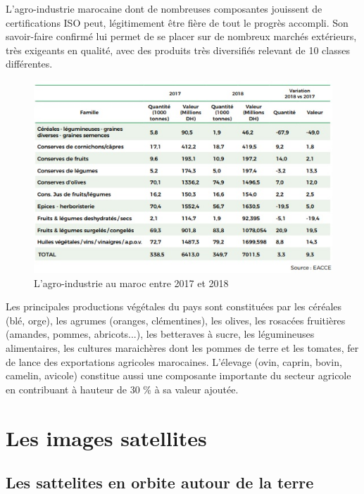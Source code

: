 \documentclass[12pt, openany]{report}
\begin{document}
L’agro-industrie marocaine dont de nombreuses composantes jouissent de certifications ISO peut, légitimement être fière de tout le progrès accompli. Son savoir-faire confirmé lui permet de se placer sur de nombreux marchés extérieurs, très exigeants en qualité, avec des produits très diversifiés relevant de 10 classes différentes.\cite{agr}


\begin{figure}[H]
\centering
\includegraphics[scale=1.2]{agr.jpg}
\caption{L'agro-industrie au maroc entre 2017 et 2018}
\end{figure}


Les principales productions végétales du pays sont constituées par les céréales (blé, orge), les agrumes (oranges, clémentines), les olives, les rosacées fruitières (amandes, pommes, abricots...), les betteraves à sucre, les légumineuses alimentaires, les cultures maraichères dont les pommes de terre et les tomates, fer de lance des exportations agricoles marocaines. L'élevage (ovin, caprin, bovin, camelin, avicole) constitue aussi une composante importante du secteur agricole en contribuant à hauteur de 30 \% à sa valeur ajoutée.

\section{Les images satellites}

\subsection{Les sattelites en orbite autour de la terre}
\end{document}
